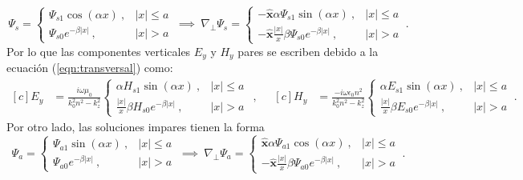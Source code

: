 \begin{equation*}
	\Psi_s = \left\{\begin{matrix}
	\Psi_{s1}\cos(\alpha x) \ , & |x|\le a
	\\
	\Psi_{s0}e^{-\beta|x|} \ , & |x|>a
	\end{matrix}\right.
	\
	\implies 	
	\	
	\nabla_\perp \Psi_s = \left\{\begin{matrix}
	-\hat{\textbf{x}}\alpha\Psi_{s1}\sin(\alpha x) \ , & |x|\le a
	\\
	-\hat{\textbf{x}}\frac{|x|}{x}\beta\Psi_{s0}e^{-\beta|x|} \ , & |x|>a
	\end{matrix}\right.
	\
	.
\end{equation*}
Por lo que las componentes verticales $E_y$ y $H_y$ pares se escriben debido a la ecuación (\ref{eqn:transversal}) como:
\begin{equation*}
	\begin{aligned}[c]
	 E_y &= \frac{i \omega\mu_0}{k_0^2n^2-k_z^2} \left\{\begin{matrix}
	 \alpha H_{s1}\sin(\alpha x) \ ,	 & |x|\le a
	 \\
	 \frac{|x|}{x}\beta H_{s0}e^{-\beta|x|} \ , & |x|>a
	 \end{matrix}\right.
\end{aligned} 
,\quad
	\begin{aligned}[c]
	 H_y &= \frac{-i\omega \epsilon_0 n^2}{k_0^2n^2-k_z^2} \left\{\begin{matrix}
	 \alpha E_{s1}\sin(\alpha x) \ ,	& |x|\le a
	 \\
	 \frac{|x|}{x}\beta E_{s0}e^{-\beta|x|} \ , & |x|>a
	 \end{matrix}\right.
	 \
	 .
\end{aligned} 
\end{equation*}
Por otro lado, las soluciones impares tienen la forma
\begin{equation*}
	\Psi_a = \left\{\begin{matrix}
	\Psi_{a1}\sin(\alpha x) \ , & |x|\le a
	\\
	\Psi_{a0}e^{-\beta|x|} \ , & |x|>a
	\end{matrix}\right.
	\
	\implies
	\
		\nabla_\perp \Psi_a = \left\{\begin{matrix}
	\hat{\textbf{x}}\alpha\Psi_{a1}\cos(\alpha x) \ , & |x|\le a
	\\
	-\hat{\textbf{x}}\frac{|x|}{x}\beta\Psi_{a0}e^{-\beta|x|} \ , & |x|>a
	\end{matrix}\right.
	\
	.
\end{equation*}
